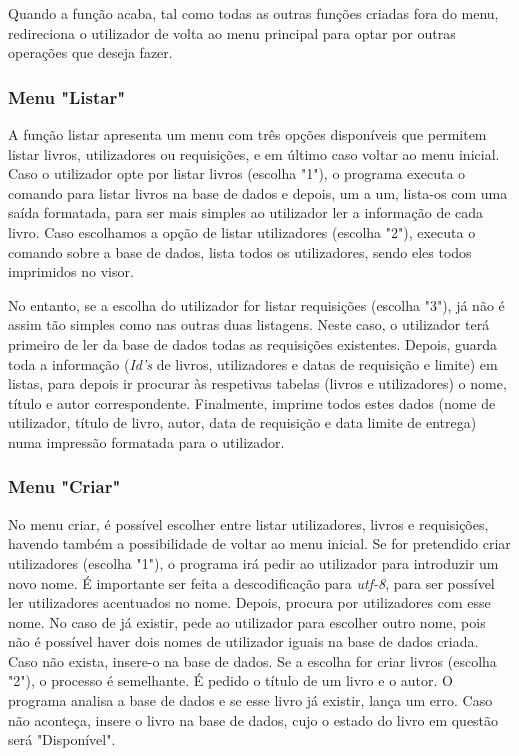 \documentclass[11pt,openany,twoside]{report}
\begin{document}
Quando a função acaba, tal como todas as outras funções criadas fora do menu, redireciona o utilizador de volta ao menu principal para optar por outras operações que deseja fazer.

\subsubsection{Menu "Listar"}

A função listar apresenta um menu com três opções disponíveis que permitem listar livros, utilizadores ou requisições, e em último caso voltar ao menu inicial. Caso o utilizador opte por listar livros (escolha "1"), o programa executa o comando para listar livros na base de dados e depois, um a um, lista-os com uma saída formatada, para ser mais simples ao utilizador ler a informação de cada livro. Caso escolhamos a opção de listar utilizadores (escolha "2"), executa o comando sobre a base de dados, lista todos os utilizadores, sendo eles todos imprimidos no visor.

No entanto, se a escolha do utilizador for listar requisições (escolha "3"), já não é assim tão simples como nas outras duas listagens. Neste caso, o utilizador terá primeiro de ler da base de dados todas as requisições existentes. Depois, guarda toda a informação (\textit{Id's} de livros, utilizadores e datas de requisição e limite) em listas, para depois ir procurar às respetivas tabelas (livros e utilizadores) o nome, título e autor correspondente. Finalmente, imprime todos estes dados (nome de utilizador, título de livro, autor, data de requisição e data limite de entrega) numa impressão formatada para o utilizador.

\subsubsection{Menu "Criar"}

No menu criar, é possível escolher entre listar utilizadores, livros e requisições, havendo também a possibilidade de voltar ao menu inicial. Se for pretendido criar utilizadores (escolha "1"), o programa irá pedir ao utilizador para introduzir um novo nome. É importante ser feita a descodificação para \textit{utf-8}, para ser possível ler utilizadores acentuados no nome. Depois, procura por utilizadores com esse nome. No caso de já existir, pede ao utilizador para escolher outro nome, pois não é possível haver dois nomes de utilizador iguais na base de dados criada. Caso não exista, insere-o na base de dados.
Se a escolha for criar livros (escolha "2"), o processo é semelhante. É pedido o título de um livro e o autor. O programa analisa a base de dados e se esse livro já existir, lança um erro. Caso não aconteça, insere o livro na base de dados, cujo o estado do livro em questão será "Disponível".
\end{document}
